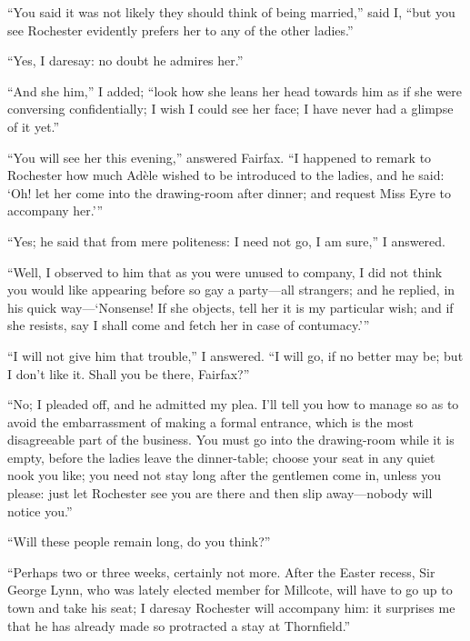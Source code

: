 \enquote{You said it was not likely they should think of being married,}
said I, \enquote{but you see \Mr{} Rochester evidently prefers her to any
	of the other ladies.}

\enquote{Yes, I daresay: no doubt he admires her.}

\enquote{And she him,} I added; \enquote{look how she leans her head
	towards him as if she were conversing confidentially; I wish I could see
	her face; I have never had a glimpse of it yet.}

\enquote{You will see her this evening,} answered \Mrs{} Fairfax.
\enquote{I happened to remark to \Mr{} Rochester how much Adèle wished to
	be introduced to the ladies, and he said: \enquote{Oh! let her come
		into the drawing-room after dinner; and request Miss Eyre to accompany
		her.}}

\enquote{Yes; he said that from mere politeness: I need not go, I am
	sure,} I answered.

\enquote{Well, I observed to him that as you were unused to company, I
	did not think you would like appearing before so gay a party---all
	strangers; and he replied, in his quick way---\enquote{Nonsense! If she
		objects, tell her it is my particular wish; and if she resists, say I
		shall come and fetch her in case of contumacy.}}

\enquote{I will not give him that trouble,} I answered. \enquote{I will
	go, if no better may be; but I don't like it. Shall you be there, \Mrs{}
	Fairfax?}

\enquote{No; I pleaded off, and he admitted my plea. I'll tell you how
	to manage so as to avoid the embarrassment of making a formal entrance,
	which is the most disagreeable part of the business. You must go into
	the drawing-room while it is empty, before the ladies leave the
	dinner-table; choose your seat in any quiet nook you like; you need not
	stay long after the gentlemen come in, unless you please: just let \Mr{}
	Rochester see you are there and then slip away---nobody will notice
	you.}

\enquote{Will these people remain long, do you think?}

\enquote{Perhaps two or three weeks, certainly not more. After the
	Easter recess, Sir George Lynn, who was lately elected member for
	Millcote, will have to go up to town and take his seat; I daresay \Mr{}
	Rochester will accompany him: it surprises me that he has already made
	so protracted a stay at Thornfield.}

